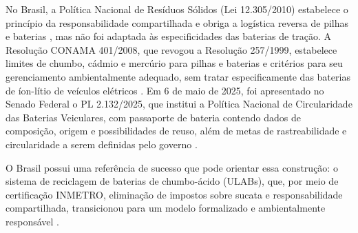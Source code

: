 No Brasil, a Política Nacional de Resíduos Sólidos (Lei 12.305/2010) estabelece o
princípio da responsabilidade compartilhada e obriga a logística reversa de
pilhas e baterias \cite{pnrs2010}, mas não foi adaptada às especificidades das
baterias de tração. A Resolução CONAMA 401/2008, que revogou a Resolução
257/1999, estabelece limites de chumbo, cádmio e mercúrio para pilhas e baterias
e critérios para seu gerenciamento ambientalmente adequado, sem tratar
especificamente das baterias de íon-lítio de veículos elétricos
\cite{conama2008,oliveira2025}. Em 6 de maio de 2025, foi apresentado no Senado
Federal o PL 2.132/2025, que institui a Política Nacional de Circularidade das
Baterias Veiculares, com passaporte de bateria contendo dados de composição,
origem e possibilidades de reuso, além de metas de rastreabilidade e
circularidade a serem definidas pelo governo \cite{dialogueearth2026}
.

O Brasil possui uma referência de sucesso que pode orientar essa construção: o
sistema de reciclagem de baterias de chumbo-ácido (ULABs), que, por meio de
certificação INMETRO, eliminação de impostos sobre sucata e responsabilidade
compartilhada, transicionou para um modelo formalizado e ambientalmente
responsável \cite{leadbatteries2024}.

